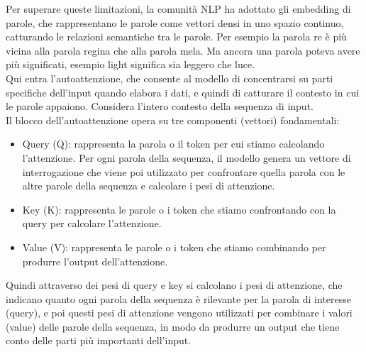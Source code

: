 Per superare queste limitazioni, la comunità NLP ha adottato gli embedding di parole, che rappresentano le parole come vettori densi in uno spazio continuo, catturando le relazioni semantiche tra le parole. Per
esempio la parola re è più vicina alla parola regina che alla parola mela. Ma ancora una parola poteva avere più significati, esempio light significa sia leggero che luce.\\

Qui entra l'autoattenzione, che consente al modello di concentrarsi su parti specifiche dell'input quando elabora i dati, e quindi di catturare il contesto in cui le parole appaiono.
Considera l'intero contesto della sequenza di input.\\

Il blocco dell'autoattenzione opera su tre componenti (vettori) fondamentali:
\begin{itemize}
    \item Query (Q): rappresenta la parola o il token per cui stiamo calcolando l'attenzione. Per ogni parola della sequenza, il modello genera un vettore di interrogazione
    che viene poi utilizzato per confrontare quella parola con le altre parole della sequenza e calcolare i pesi di attenzione.
    \item Key (K): rappresenta le parole o i token che stiamo confrontando con la query per calcolare l'attenzione.
    \item Value (V): rappresenta le parole o i token che stiamo combinando per produrre l'output dell'attenzione.
\end{itemize}

Quindi attraverso dei pesi di query e key si calcolano i pesi di attenzione, che indicano quanto ogni parola della sequenza è rilevante per la parola di interesse (query), 
e poi questi pesi di attenzione vengono utilizzati per combinare i valori (value) delle parole della sequenza, in modo da produrre un output che tiene conto delle parti più importanti dell'input.\\

